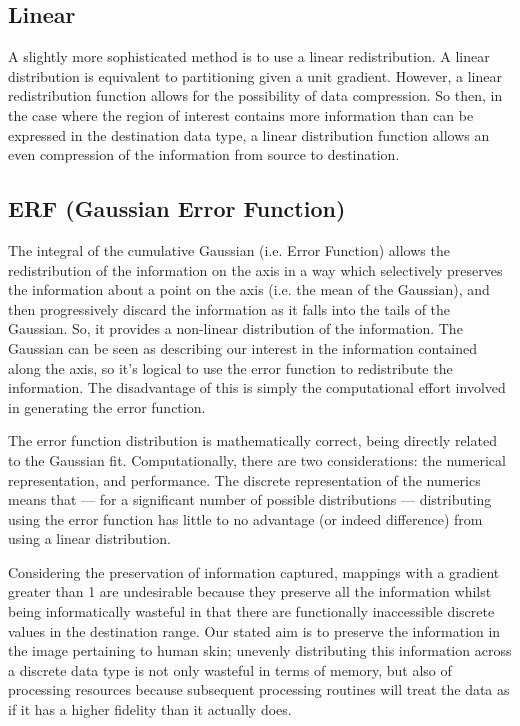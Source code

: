 \subsection{Linear}\label{sec:Linear}

A slightly more sophisticated method is to use a linear redistribution. A linear distribution is equivalent to partitioning given a unit gradient. However, a linear redistribution function allows for the possibility of data compression. So then, in the case where the region of interest contains more information than can be expressed in the destination data type, a linear distribution function allows an even compression of the information from source to destination. ~\cite{Lee2002}

\subsection{ERF (Gaussian Error Function)}\label{sec:ERF}

The integral of the cumulative Gaussian (i.e. Error Function) allows the redistribution of the information on the axis in a way which selectively preserves the information about a point on the axis (i.e. the mean of the Gaussian), and then progressively discard the information as it falls into the tails of the Gaussian. So, it provides a non-linear distribution of the information. The Gaussian can be seen as describing our interest in the information contained along the axis, so it's logical to use the error function to redistribute the information. The disadvantage of this is simply the computational effort involved in generating the error function.

The error function distribution is mathematically correct, being directly related to the Gaussian fit. Computationally, there are two considerations: the numerical representation, and performance. The discrete representation of the numerics means that --- for a significant number of possible distributions --- distributing using the error function has little to no advantage (or indeed difference) from using a linear distribution.

Considering the preservation of information captured, mappings with a gradient greater than 1 are undesirable because they preserve all the information whilst being informatically wasteful in that there are functionally inaccessible discrete values in the destination range. Our stated aim is to preserve the information in the image pertaining to human skin; unevenly distributing this information across a discrete data type is not only wasteful in terms of memory, but also of processing resources because subsequent processing routines will treat the data as if it has a higher fidelity than it actually does.

